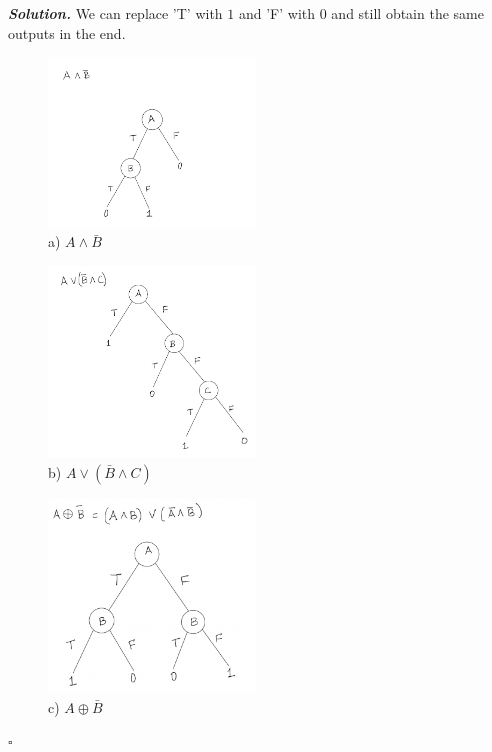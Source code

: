 \documentclass[10pt]{article}
\newenvironment{solution}[1][\it{Solution}]{\textbf{#1. } }{$\square$}
\begin{document}
\begin{solution}
We can replace 'T' with $1$ and 'F' with $0$ and still obtain the same outputs in the end.
\begin{figure}[H]
\includegraphics[width=5.5cm, keepaspectratio]{Problem6_a}
\caption{a) $A \wedge \bar{B}$}
\end{figure}
\begin{figure}[H]
\includegraphics[width=5.5cm, keepaspectratio]{Problem6_b}
\caption{b) $A \vee(\bar{B} \wedge C)$}
\end{figure}
\begin{figure}[H]
\includegraphics[width=5.5cm, keepaspectratio]{Problem6_c}
\caption{c) $A \oplus \bar{B}$}
\end{figure}


\end{solution}


\medskip
\end{document}
